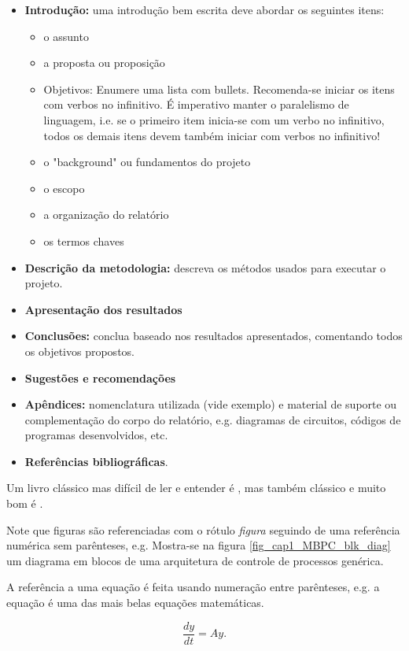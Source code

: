 \begin{itemize}
\item {\bf Introdução:} uma introdução bem escrita deve abordar os seguintes itens:
  \begin{itemize}
  	\item o assunto  	\item a proposta ou proposição
	\item Objetivos: 
	Enumere uma lista com bullets. Recomenda-se iniciar os itens com verbos no infinitivo. É imperativo manter o paralelismo de linguagem, i.e. se o primeiro item inicia-se com um verbo no infinitivo, todos os demais itens devem também iniciar com verbos no infinitivo!
  	\item o "background" ou fundamentos do projeto  	\item o escopo  	\item a organização do relatório 	 \item os termos chaves
  \end{itemize}
	  \item {\bf Descrição da metodologia:} descreva os métodos usados para executar o projeto.  \item {\bf Apresentação dos resultados}  \item {\bf Conclusões:} conclua baseado nos resultados apresentados, comentando todos os objetivos propostos.  \item {\bf Sugestões e recomendações}  \item {\bf Apêndices:} nomenclatura utilizada (vide exemplo) e material de suporte ou complementação do corpo do relatório, e.g. diagramas de circuitos, códigos de programas desenvolvidos, etc.  \item {\bf Referências bibliográficas}.
\end{itemize}

Um livro clássico mas difícil de ler e entender é \cite{Astrom:1970}, mas também clássico e muito bom é \cite{Astrom:1997}.

Note que figuras são referenciadas com o rótulo {\it figura} seguindo de uma referência numérica sem parênteses, e.g. Mostra-se na figura \ref{fig_cap1_MBPC_blk_diag} um diagrama em blocos de uma arquitetura de controle de processos genérica.

A referência a uma equação é feita usando numeração entre parênteses, e.g. a equação  é uma das mais belas equações matemáticas.

\begin{equation}
 \frac{dy}{dt} = A y.   
 \label{eq_piuBella}
\end{equation}


